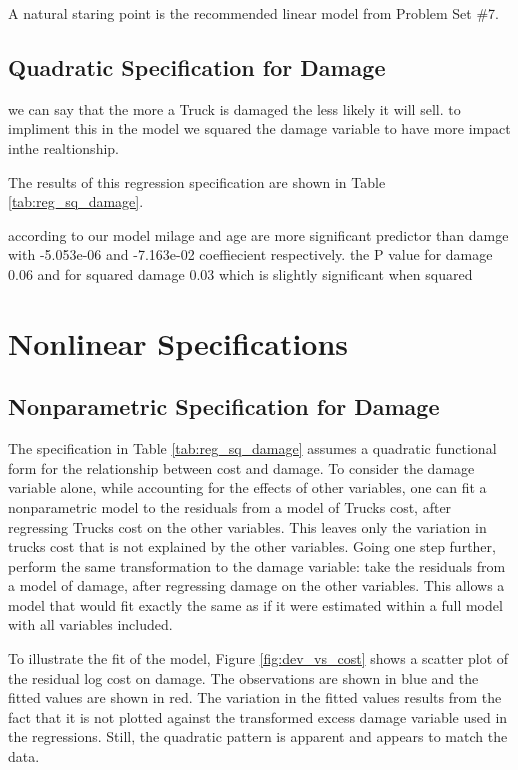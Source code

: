 \documentclass[11pt]{paper}
\begin{document}
A natural staring point is the recommended linear model
from Problem Set \#7. 

\subsection{Quadratic Specification for Damage}

we can say that the more a Truck is damaged the less likely it will sell. 
to impliment this in the model we squared the damage variable to have more impact inthe realtionship.


The results of this regression specification are shown in 
Table \ref{tab:reg_sq_damage}. 
% 

% 
according to our model milage and age are more significant predictor than damge with -5.053e-06 and -7.163e-02 coeffiecient respectively. 
the P value for damage 0.06 and for squared damage 0.03 which is slightly significant when squared







\clearpage
\section{Nonlinear Specifications}


\subsection{Nonparametric Specification for Damage}


The specification in 
Table \ref{tab:reg_sq_damage}
assumes a quadratic functional form for
the relationship between cost and damage. 
To consider the damage variable alone, 
while accounting for the effects of other variables, 
one can fit a nonparametric model to the residuals 
from a model of Trucks cost, 
after regressing Trucks cost on the other variables. 
This leaves only the variation in trucks cost that is not explained by the other variables. 
Going one step further, perform the same transformation to the damage variable:
take the residuals from a model of damage, 
after regressing damage on the other variables. 
This allows a model that would fit exactly the same as if it were estimated within a full model with all variables included. 




\pagebreak 
To illustrate the fit of the model, 
Figure \ref{fig:dev_vs_cost} shows a scatter plot 
of the residual log cost on damage. 
The observations are shown in blue
and the fitted values are shown in red.
The variation in the fitted values results from the 
fact that it is not plotted against the transformed excess damage variable used in the regressions.
Still, the quadratic pattern is apparent
and appears to match the data. 
\end{document}
